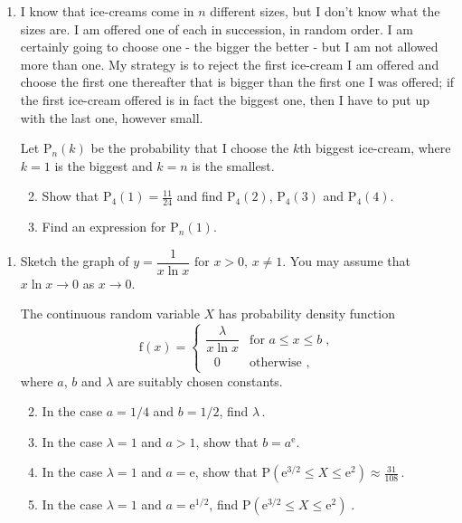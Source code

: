 \documentclass[a4, 11pt]{report}
\newlength{\qspace}
\newcounter{qnumber}
\newenvironment{question}%
 {\vspace{\qspace}
  \begin{enumerate}[\bfseries 1\quad][10]%
    \setcounter{enumi}{\value{qnumber}}%
    \item%
 }
{
  \end{enumerate}
  \filbreak
  \stepcounter{qnumber}
 }
\newenvironment{questionparts}[1][1]%
 {
  \begin{enumerate}[\bfseries (i)]%
    \setcounter{enumii}{#1}
    \addtocounter{enumii}{-1}
    \setlength{\itemsep}{5mm}
    \setlength{\parskip}{8pt}
 }
 {
  \end{enumerate}
 }
\def\e{{\mathrm e}}
\def\f{{\mathrm f}}
\def\P{{\mathrm P}}
\def\le{\leqslant}
\begin{document}
\begin{question}
I know that 
ice-creams come in $n$ different sizes, but I don't know what the sizes are.
I am offered one of each in 
succession, in random order.
I am certainly going to choose one - the bigger
the better -  but I
am not allowed more than one. My strategy is to reject the first  
ice-cream I am offered
 and choose the  first one thereafter  that is bigger than the first 
one I was offered; if the first ice-cream offered is in fact the biggest one,
then I have to put up with the last one, however small.

Let $\P_n(k)$ be the probability that I choose the $k$th biggest ice-cream,
where $k=1$ is the biggest and $k=n$ is the smallest.

\begin{questionparts}
\item Show that $\P_4(1) = \frac{11}{24}$ and find $\P_4(2)$, $\P_4(3)$
and $\P_4(4)$.
\item Find an expression  for $\P_n(1)$.
\end{questionparts}
\end{question}

\begin{question}
Sketch the graph of 
$
 y= \dfrac1 { x \ln x}
\text{ \ \ for $x>0$, \ $x\ne1$}.
$
You may assume that $x\ln x \to 0$ as $x\to 0$.


The continuous random variable $X$ has probability density function 
\[
\f(x) = 
\begin{cases}
\dfrac \lambda {x\ln x}& \text{for $a\le x \le b$}\;, \\[3mm]
\ \ \  0 & \text{otherwise },
\end{cases}
\]
where $a$, $b$ and $\lambda$ are suitably chosen constants.

\begin{questionparts}

\item In the case $a=1/4$ and $b=1/2$, find $\lambda\,$.
\item In the case $\lambda=1$ and $a>1$, show that $b=a^\e$.
\item In the case $\lambda =1$ and $a=\e$, show that 
$\P(\e^{3/2}\le X \le \e^2)\approx \frac {31}{108}\,$.
\item In the case $\lambda =1$ and $a=\e^{1/2}$, find  
$\P(\e^{3/2}\le X \le \e^2)\;$.

\end{questionparts}
\end{question}
	
\end{document}
